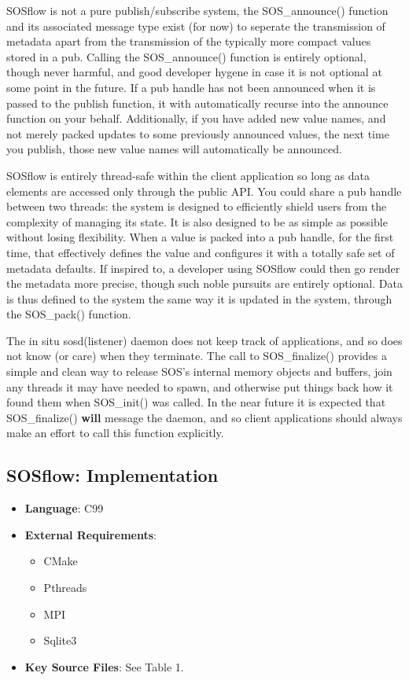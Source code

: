 SOSflow is not a pure publish/subscribe system, the SOS\_announce()
function and its associated message type exist (for now) to seperate the
transmission of metadata apart from the transmission of the typically
more compact values stored in a pub.
%
Calling the SOS\_announce() function is entirely optional, though
never harmful, and good developer hygene in case it is not optional at
some point in the future.
%
If a pub handle has not been announced when it is passed to the
publish function, it with automatically recurse into the announce
function on your behalf.
%
Additionally, if you have added new value names, and not merely packed
updates to some previously announced values, the next time you
publish, those new value names will automatically be announced.

SOSflow is entirely thread-safe within the client application so long
as data elements are accessed only through the public API.
%
You could share a pub handle between two threads: the system is
designed to efficiently shield users from the complexity of managing
its state.
%
It is also designed to be as simple as possible without losing
flexibility.
%
When a value is packed into a pub handle, for the first time, that
effectively defines the value and configures it with a totally safe
set of metadata defaults.
%
If inspired to, a developer using SOSflow could then go render the
metadata more precise, though such noble pursuits are entirely
optional.
%
Data is thus defined to the system the same way it is updated in the
system, through the SOS\_pack() function.

The in situ sosd(listener) daemon does not keep track of applications,
and so does not know (or care) when they terminate.
%
The call to SOS\_finalize() provides a simple and clean way to release
SOS's internal memory objects and buffers, join any threads it may
have needed to spawn, and otherwise put things back how it found them
when SOS\_init() was called.
%
In the near future it is expected that SOS\_finalize() \textbf{will}
message the daemon, and so client applications should always make an
effort to call this function explicitly.

\subsection{SOSflow: Implementation}
%
\begin{itemize}
    \item \textbf{Language}: C99
    \item \textbf{External Requirements}:
      \begin{itemize}
          \item CMake
          \item Pthreads
          \item MPI
          \item Sqlite3
      \end{itemize}
  \item \textbf{Key Source Files}: See Table 1.
\end{itemize}

